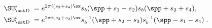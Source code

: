 \begin{equation}\label{efdef}
\begin{aligned}
\SU_{\rm\sst D}^{s}\;=\;&e^{2\pi i (s_3+s_4)\sx}
s_b(\spp+s_1-s_2)s_b(\spp+s_3+s_4),\\
\SU_{\rm\sst D}^{t}\;=\;&e^{2\pi i (s_2+s_3)\sx}
     s_b^{-1}(\spp+s_2-s_3)s_b^{-1}(\spp-s_1-s_4)\;.
\end{aligned}
\end{equation}

